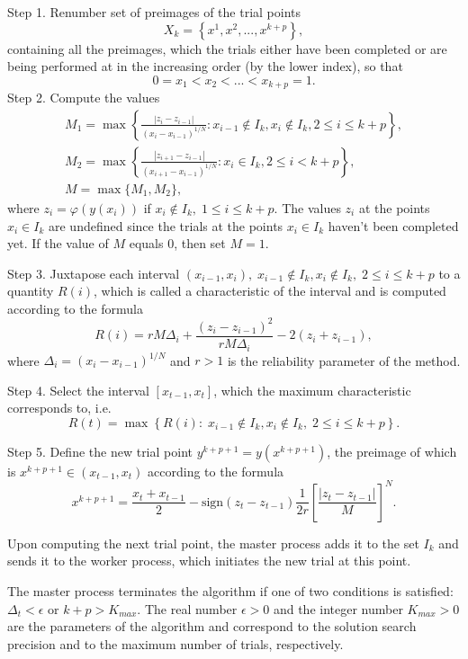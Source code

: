\documentclass{svproc}
\begin{document}
Step 1. Renumber set of preimages of the trial points 
\[
X_k = \left\{x^1, x^2,...,x^{k+p} \right\},
\]
containing all the preimages, which the trials either have been completed or are being performed at in the increasing order (by the lower index), so that
\[
0=x_1<x_2<...<x_{k+p}=1.
\]
Step 2. Compute the values 
\begin{gather*}
M_1=\max \left\{ \frac{ \left|z_i - z_{i-1} \right|}{(x_i-x_{i-1})^{1/N}} : x_{i-1} \notin I_k, x_i \notin I_k, 2\leq i\leq k+p \right\},\\
M_2=\max \left\{ \frac{ \left|z_{i+1} - z_{i-1} \right|}{(x_{i+1}-x_{i-1})^{1/N}} : x_i \in I_k, 2\leq i < k+p \right\},\\
M=\max\{M_1,M_2\},
\end{gather*}
where $z_i=\varphi(y(x_i))$ if $x_i \notin I_k, \; 1\leq i \leq k+p$. The values $z_i$ at the points $x_i \in I_k$ are undefined since the trials at the points $x_i \in I_k$ haven't been completed yet. If the value of $M$ equals 0, then set $M=1$.

Step 3. Juxtapose each interval $(x_{i-1},x_i), \; x_{i-1} \notin I_k, x_i \notin I_k, \; 2\leq i\leq k+p$ to a quantity $R(i)$, which is called a characteristic of the interval and is computed according to the formula
\begin{equation}\label{R}
R(i)=rM\Delta_i+\frac{(z_i-z_{i-1})^2}{rM\Delta_i}-2(z_i+z_{i-1}),
\end{equation}
where $\Delta_i=\left(x_i-x_{i-1}\right)^{1/N}$ and $r>1$ is the reliability parameter of the method.

Step 4. Select the interval $[x_{t-1},x_t]$, which the maximum characteristic corresponds to, i.e.
\[
R(t) = \max \left\{ R(i): \; x_{i-1} \notin I_k, x_i \notin I_k, \; 2\leq i\leq k+p \right\}.
\]

Step 5. Define the new trial point $y^{k+p+1}=y(x^{k+p+1})$, the preimage of which is $x^{k+p+1} \in (x_{t-1},x_t)$ according to the formula
\[
x^{k+p+1} = \frac{x_{t}+x_{t-1}}{2} - \mathrm{sign}(z_{t}-z_{t-1})\frac{1}{2r}\left[\frac{\left|z_{t}-z_{t-1}\right|}{M}\right]^N.
\]

Upon computing the next trial point, the master process adds it to the set $I_k$ and sends it to the worker process, which initiates the new trial at this point. 

The master process terminates the algorithm if one of two conditions is satisfied: $\Delta_{t}<\epsilon$ or $k+p>K_{max}$.
The real number $\epsilon>0$ and the integer number $K_{max}>0$ are the parameters of the algorithm and correspond to the solution search precision and to the maximum number of trials, respectively.
\end{document}
